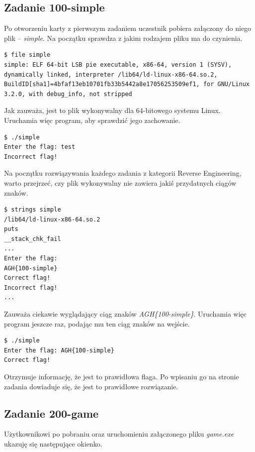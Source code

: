 \documentclass[polish,12pt]{aghthesis}
\begin{document}
\subsection{Zadanie 100-simple}

Po otworzeniu karty z pierwszym zadaniem uczestnik pobiera załączony do niego
plik -- \emph{simple}.
Na początku sprawdza z jakim rodzajem pliku ma do czynienia.

\begin{verbatim}
$ file simple
simple: ELF 64-bit LSB pie executable, x86-64, version 1 (SYSV), dynamically linked, interpreter /lib64/ld-linux-x86-64.so.2, BuildID[sha1]=4bfaf13eb10701fb33b5442a8e17056253509ef1, for GNU/Linux 3.2.0, with debug_info, not stripped
\end{verbatim}

Jak zauważa, jest to plik wykonywalny dla 64-bitowego systemu Linux.
Uruchamia więc program, aby sprawdzić jego zachowanie.

\begin{verbatim}
$ ./simple
Enter the flag: test
Incorrect flag!
\end{verbatim}

Na początku rozwiązywania każdego zadania z kategorii Reverse Engineering, warto
przejrzeć, czy plik wykonywalny nie zawiera jakiś przydatnych ciągów znaków.

\begin{verbatim}
$ strings simple
/lib64/ld-linux-x86-64.so.2
puts
__stack_chk_fail
...
Enter the flag: 
AGH{100-simple}
Correct flag!
Incorrect flag!
...
\end{verbatim}

Zauważa ciekawie wyglądający ciąg znaków \emph{AGH\{100-simple\}}.
Uruchamia więc program jeszcze raz, podając mu ten ciąg znaków na wejście.

\begin{verbatim}
$ ./simple
Enter the flag: AGH{100-simple}
Correct flag!
\end{verbatim}

Otrzymuje informację, że jest to prawidłowa flaga.
Po wpisaniu go na stronie zadania dowiaduje się, że jest to prawidłowe rozwiązanie.

\subsection{Zadanie 200-game}

Użytkownikowi po pobraniu oraz uruchomieniu załączonego pliku \emph{game.exe} ukazuję
się następujące okienko.
\end{document}
